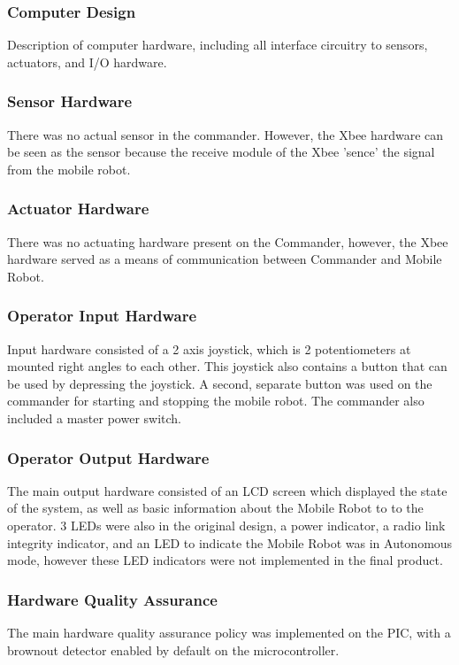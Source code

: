 \documentclass[11pt,a4paper]{article}
\begin{document}
    \subsubsection{Computer Design}
      Description of computer hardware, including all interface circuitry to sensors, actuators, and I/O hardware.
    \subsubsection{Sensor Hardware}
    There was no actual sensor in the commander. However, the Xbee hardware can be seen as the sensor because the receive module of the Xbee 'sence' the signal from the mobile robot. 
    \subsubsection{Actuator Hardware}
      There was no actuating hardware present on the Commander, however, the Xbee hardware served as a means of communication between Commander and Mobile Robot.
    \subsubsection{Operator Input Hardware}
      Input hardware consisted of a 2 axis joystick, which is 2 potentiometers at mounted right angles to each other. This joystick also contains a button that can be used by depressing the joystick. A second, separate button was used on the commander for starting and stopping the mobile robot. The commander also included a master power switch.
    \subsubsection{Operator Output Hardware}
      The main output hardware consisted of an LCD screen which displayed the state of the system, as well as basic information about the Mobile Robot to to the operator. 3 LEDs were also in the original design, a power indicator, a radio link integrity indicator, and an LED to indicate the Mobile Robot was in Autonomous mode, however these LED indicators were not implemented in the final product.
    \subsubsection{Hardware Quality Assurance}
      The main hardware quality assurance policy was implemented on the PIC, with a brownout detector enabled by default on the microcontroller.\\
\end{document}
